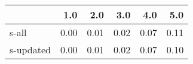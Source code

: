 \begin{tabular}{lrrrrr}
\toprule
{} &  1.0 &  2.0 &  3.0 &  4.0 &  5.0 \\
\midrule
s-all     & 0.00 & 0.01 & 0.02 & 0.07 & 0.11 \\
s-updated & 0.00 & 0.01 & 0.02 & 0.07 & 0.10 \\
\bottomrule
\end{tabular}
